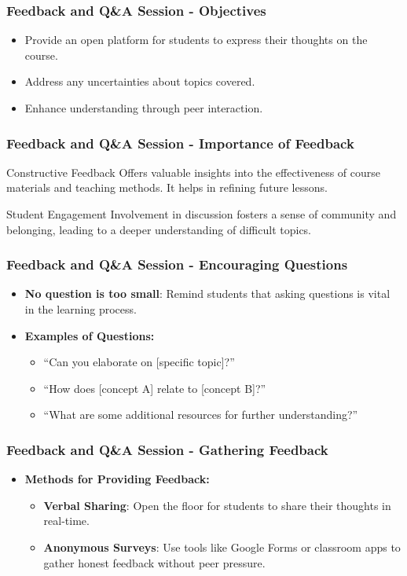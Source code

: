 \documentclass[aspectratio=169]{beamer}
\begin{document}
\begin{frame}[fragile]
    \frametitle{Feedback and Q\&A Session - Objectives}
    \begin{itemize}
        \item Provide an open platform for students to express their thoughts on the course.
        \item Address any uncertainties about topics covered.
        \item Enhance understanding through peer interaction.
    \end{itemize}
\end{frame}

\begin{frame}[fragile]
    \frametitle{Feedback and Q\&A Session - Importance of Feedback}
    \begin{block}{Constructive Feedback}
        Offers valuable insights into the effectiveness of course materials and teaching methods. It helps in refining future lessons.
    \end{block}
    \begin{block}{Student Engagement}
        Involvement in discussion fosters a sense of community and belonging, leading to a deeper understanding of difficult topics.
    \end{block}
\end{frame}

\begin{frame}[fragile]
    \frametitle{Feedback and Q\&A Session - Encouraging Questions}
    \begin{itemize}
        \item \textbf{No question is too small}: Remind students that asking questions is vital in the learning process.
        \item \textbf{Examples of Questions:}
        \begin{itemize}
            \item ``Can you elaborate on [specific topic]?''
            \item ``How does [concept A] relate to [concept B]?''
            \item ``What are some additional resources for further understanding?''
        \end{itemize}
    \end{itemize}
\end{frame}

\begin{frame}[fragile]
    \frametitle{Feedback and Q\&A Session - Gathering Feedback}
    \begin{itemize}
        \item \textbf{Methods for Providing Feedback:}
        \begin{itemize}
            \item \textbf{Verbal Sharing}: Open the floor for students to share their thoughts in real-time.
            \item \textbf{Anonymous Surveys}: Use tools like Google Forms or classroom apps to gather honest feedback without peer pressure.
        \end{itemize}
    \end{itemize}
\end{frame}
\end{document}
